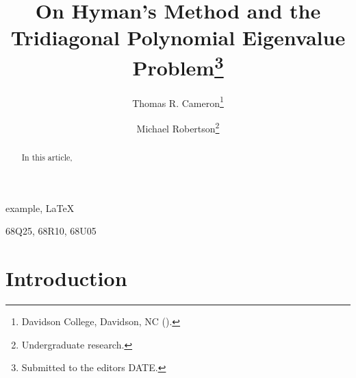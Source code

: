 \documentclass[review,onefignum,onetabnum]{siamart171218}
\title{On Hyman's Method and the Tridiagonal Polynomial Eigenvalue Problem\thanks{Submitted to the editors DATE.}}
\author{Thomas R. Cameron\thanks{Davidson College, Davidson, NC
  (\email{thcameron@davidson.edu}).}
\and Michael Robertson\thanks{Undergraduate research.}}
\begin{document}
\maketitle

\begin{abstract}
In this article, 
\end{abstract}

\begin{keywords}
  example, \LaTeX
\end{keywords}

\begin{AMS}
  68Q25, 68R10, 68U05
\end{AMS}

\section{Introduction}





\end{document}
